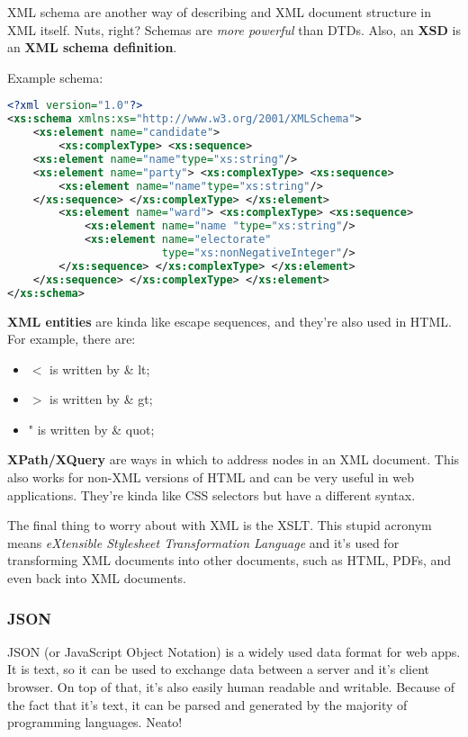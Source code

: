 \documentclass[11pt,a4paper,titlepage,dvipsnames,cmyk]{scrartcl}
\begin{document}
XML schema are another way of describing and XML document structure in XML
itself. Nuts, right? Schemas are \textit{more powerful} than DTDs. Also,
an \textbf{XSD} is an \textbf{XML schema definition}.

Example schema:
\begin{lstlisting}[language=XML]
<?xml version="1.0"?>
<xs:schema xmlns:xs="http://www.w3.org/2001/XMLSchema">
    <xs:element name="candidate">
        <xs:complexType> <xs:sequence>
    <xs:element name="name"type="xs:string"/>
    <xs:element name="party"> <xs:complexType> <xs:sequence>
        <xs:element name="name"type="xs:string"/>
    </xs:sequence> </xs:complexType> </xs:element>
        <xs:element name="ward"> <xs:complexType> <xs:sequence>
            <xs:element name="name "type="xs:string"/>
            <xs:element name="electorate"
                        type="xs:nonNegativeInteger"/>
        </xs:sequence> </xs:complexType> </xs:element>
    </xs:sequence> </xs:complexType> </xs:element>
</xs:schema>
\end{lstlisting}

\textbf{XML entities} are kinda like escape sequences, and they're also
used in HTML. For example, there are:
\begin{itemize}
    \item $<$ is written by \& lt;
    \item $>$ is written by \& gt;
    \item " is written by \& quot;
\end{itemize}

\textbf{XPath/XQuery} are ways in which to address nodes in an XML
document. This also works for non-XML versions of HTML and can be very
useful in web applications. They're kinda like CSS selectors but have a
different syntax.

The final thing to worry about with XML is the XSLT. This stupid acronym
means \textit{eXtensible Stylesheet Transformation Language} and it's used
for transforming XML documents into other documents, such as HTML, PDFs,
and even back into XML documents.

\subsubsection{JSON}%
\label{ssub:JSON}
JSON (or JavaScript Object Notation) is a widely used data format for web
apps. It is text, so it can be used to exchange data between a server and
it's client browser. On top of that, it's also easily human readable and
writable. Because of the fact that it's text, it can be parsed and
generated by the majority of programming languages. Neato!
\end{document}
